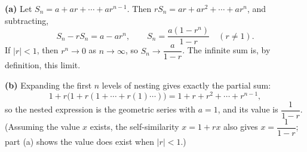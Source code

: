 \textbf{(a)} Let $S_n=a+ar+\cdots+ar^{n-1}$. Then $rS_n=ar+ar^2+\cdots+ar^n$, and subtracting,
\[
S_n-rS_n=a-ar^n,\qquad S_n=\dfrac{a\left(1-r^n\right)}{1-r}\quad(r\ne1).
\]
If $|r|<1$, then $r^n\to0$ as $n\to\infty$, so $S_n\to\dfrac{a}{1-r}$. The infinite sum is, by definition, this limit.

\textbf{(b)} Expanding the first $n$ levels of nesting gives exactly the partial sum:
\[
1+r\big(1+r(1+\cdots+r(1)\cdots)\big)=1+r+r^2+\cdots+r^{n-1},
\]
so the nested expression is the geometric series with $a=1$, and its value is $\boxed{\dfrac{1}{1-r}}$. (Assuming the value $x$ exists, the self-similarity $x=1+rx$ also gives $x=\dfrac{1}{1-r}$; part (a) shows the value does exist when $|r|<1$.)
